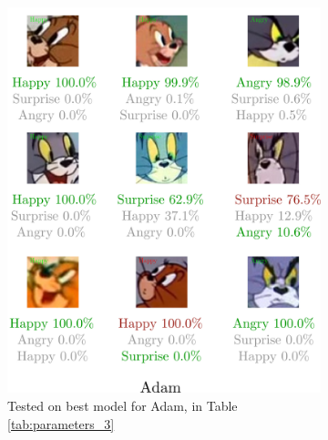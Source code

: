 \documentclass[report, 11pt, oneside]{dissertation}
\begin{document}
\begin{figure}[h]
	\begin{subfigure}{0.54\textwidth}
		\includegraphics[scale=0.125]{figure_38.pdf}
		\caption{\tiny{Tested on best model for Adam, in Table \ref{tab:parameters_3}}}
	\end{subfigure}
	\label{fig:emotion_classification_adam}
	\unskip \vrule\
	\begin{subfigure}{0.5\textwidth}

\end{subfigure}
\end{figure}
\end{document}
